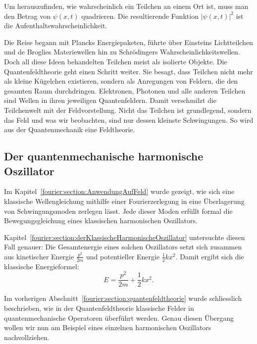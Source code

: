 	
	Um herauszufinden, wie wahrscheinlich ein Teilchen an einem Ort ist, muss man den Betrag von $\psi(x, t)$ quadrieren. 
	Die resultierende Funktion $|\psi(x, t)|^2$ ist die Aufenthaltswahrscheinlichkeit. 
	
	Die Reise begann mit Plancks Energiepaketen, führte über Einsteins Lichtteilchen und de Broglies Materiewellen hin zu Schrödingers Wahrscheinlichkeitswellen. 
	Doch all diese Ideen behandelten Teilchen meist als isolierte Objekte.
	Die Quantenfeldtheorie geht einen Schritt weiter.
	Sie besagt, dass Teilchen nicht mehr als kleine Kügelchen existieren, sondern als Anregungen von Feldern, die den gesamten Raum durchdringen. 
	Elektronen, Photonen und alle anderen Teilchen sind Wellen in ihren jeweiligen Quantenfeldern.
	Damit verschmilzt die Teilchenwelt mit der Feldvorstellung.
	Nicht das Teilchen ist grundlegend, sondern das Feld und was wir beobachten, sind nur dessen kleinste Schwingungen.
	So wird aus der Quantenmechanik eine Feldtheorie.
	
	\subsection{Der quantenmechanische harmonische Oszillator\label{fourier:subsection:derQMHarmonischeOszillator}}

	Im Kapitel~\ref{fourier:section:AnwendungAufFeld} wurde gezeigt, wie sich eine klassische Wellengleichung mithilfe einer Fourierzerlegung in eine Überlagerung von Schwingungsmoden zerlegen lässt.
	Jede dieser Moden erfüllt formal die Bewegungsgleichung eines klassischen harmonischen Oszillators.

	Kapitel~\ref{fourier:section:derKlassischeHarmonischeOszillator} untersuchte diesen Fall genauer:
	Die Gesamtenergie eines solchen Oszillators setzt sich zusammen aus kinetischer Energie \( \frac{p^2}{2m} \) und potentieller Energie \( \frac{1}{2}kx^2 \).
	Damit ergibt sich die klassische Energieformel:
	\begin{equation}
	E = \frac{p^2}{2m} + \frac{1}{2}kx^2.
	\end{equation}

	Im vorherigen Abschnitt~\ref{fourier:section:quantenfeldtheorie} wurde schliesslich beschrieben, wie in der Quantenfeldtheorie klassische Felder in quantenmechanische Operatoren überführt werden.
	Genau diesen Übergang wollen wir nun am Beispiel eines einzelnen harmonischen Oszillators nachvollziehen.

	\vspace{1em}


